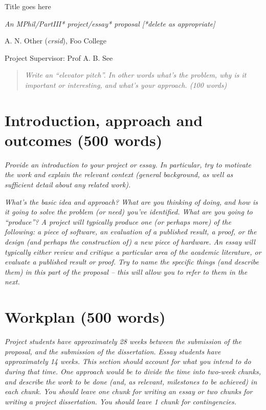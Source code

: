 \documentclass[11pt]{article}
\begin{document}
\centerline{\Large Title goes here}
\vspace{2em}
\centerline{\Large \emph{An MPhil/PartIII* project/essay* proposal [*delete as appropriate]}}
\vspace{2em}
\centerline{\large A. N. Other (\emph{crsid}), Foo College}
\vspace{1em}
\centerline{\large Project Supervisor: Prof A. B. See}
\vspace{1em}

\begin{abstract}
\textsl{Write an ``elevator pitch''. In other words what's the
  problem, why is it important or interesting, and what's your approach. (100 words)} 
\end{abstract}

\section{Introduction, approach and outcomes (500 words)}

\textsl{Provide an introduction to your project or essay. In particular, try to
  motivate the work and explain the relevant context (general
  background, as well as sufficient detail about any related
  work).}

\textsl{What's the basic idea and approach? What are you thinking of 
doing, and how is it going to solve the problem (or need) you've 
identified. What are you going to ``produce''? 
A project will typically produce one (or perhaps more) of the following:
a piece of software, an evaluation of a published result, a proof, or
the design (and perhaps the construction of) a new piece of hardware. An
essay will typically either review and critique a particular area of the
academic literature, or evaluate a published result or proof. Try to 
name the specific things (and describe them) in this part of the 
proposal -- this will allow you to refer to them in the next.} 

\section{Workplan (500 words)}
\textsl{Project students have approximately 28 weeks between the submission of 
the proposal, and the submission of the dissertation. Essay students have 
approximately 14 weeks.  This section
should account for what you intend to do during that time. One
approach would be to divide the time into two-week chunks, and 
describe the work to be done (and, as relevant, milestones to be 
achieved) in each chunk. You should leave one chunk for writing an essay or two 
chunks for writing a project dissertation. You should leave 1 chunk for contingencies.} 

\newpage
\appendix
\end{document}
